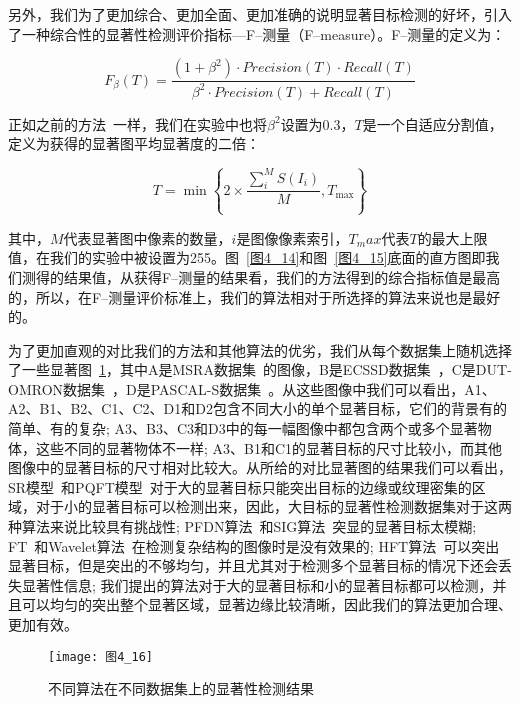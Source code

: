 另外，我们为了更加综合、更加全面、更加准确的说明显著目标检测的好坏，引入了一种综合性的显著性检测评价指标---F--测量（F--measure）。F--测量的定义为：
\begin{linenomath}
\begin{equation}
F_{\beta}(T)=\frac{(1+\beta^{2})\cdot Precision(T)\cdot Recall(T)}{\beta^{2}\cdot Precision(T)+Recall(T)}
\label{式4_29}
\end{equation}
\end{linenomath}
正如之前的方法~\cite{AchantaCVPR2009Frequency,YanQiongCVPR2013Hierarchical,ShenXiaohuiCVPR2012unified}一样，我们在实验中也将$\beta^{2}$设置为0.3，$T$是一个自适应分割值，定义为获得的显著图平均显著度的二倍：
\begin{linenomath}
\begin{equation}
T=\min\left\{2\times \frac{\sum^{M}_{i}S(I_{i})}{M},T_{\max}\right\}
\label{式4_30}
\end{equation}
\end{linenomath}
其中，$M$代表显著图中像素的数量，$i$是图像像素索引，$T_max$代表$T$的最大上限值，在我们的实验中被设置为255。图~\ref{图4_14}和图~\ref{图4_15}底面的直方图即我们测得的结果值，从获得F--测量的结果看，我们的方法得到的综合指标值是最高的，所以，在F--测量评价标准上，我们的算法相对于所选择的算法来说也是最好的。

为了更加直观的对比我们的方法和其他算法的优劣，我们从每个数据集上随机选择了一些显著图~\ref{图4_16}，其中A是MSRA数据集~\cite{LiuTieCVPR2007Learning}的图像，B是ECSSD数据集~\cite{YanQiongCVPR2013Hierarchical}，C是DUT-OMRON数据集~\cite{YangChuanCVPR2013Manifold}，D是PASCAL-S数据集~\cite{LiYinCVPR2014Secrets}。从这些图像中我们可以看出，A1、A2、B1、B2、C1、C2、D1和D2包含不同大小的单个显著目标，它们的背景有的简单、有的复杂; A3、B3、C3和D3中的每一幅图像中都包含两个或多个显著物体，这些不同的显著物体不一样; A3、B1和C1的显著目标的尺寸比较小，而其他图像中的显著目标的尺寸相对比较大。从所给的对比显著图的结果我们可以看出，SR模型~\cite{HouXiaodiCVPR2007Residual}和PQFT模型~\cite{GuoChenleiCVPR2008Spatio}对于大的显著目标只能突出目标的边缘或纹理密集的区域，对于小的显著目标可以检测出来，因此，大目标的显著性检测数据集对于这两种算法来说比较具有挑战性; PFDN算法~\cite{BianCognNeurodyn2010Visual}和SIG算法~\cite{HouXiaodiTPAMI2012Signature}突显的显著目标太模糊; FT~\cite{AchantaCVPR2009Frequency}和Wavelet算法~\cite{ImamogluTMM2013wavelet}在检测复杂结构的图像时是没有效果的; HFT算法~\cite{LiJianTPAMI2013Scale}可以突出显著目标，但是突出的不够均匀，并且尤其对于检测多个显著目标的情况下还会丢失显著性信息; 我们提出的算法对于大的显著目标和小的显著目标都可以检测，并且可以均匀的突出整个显著区域，显著边缘比较清晰，因此我们的算法更加合理、更加有效。
\begin{figure}[h]
  \centering
  \texttt{[image: 图4\_16]}
  \caption{不同算法在不同数据集上的显著性检测结果}   
  \label{图4_16} 
\end{figure}

